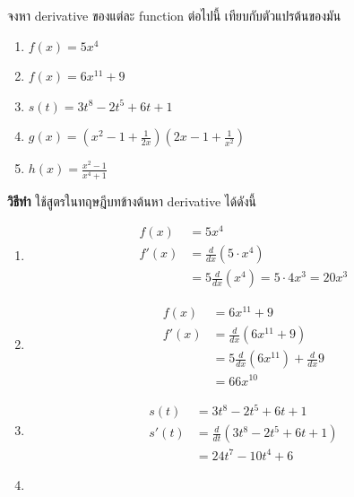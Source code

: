 \documentclass[
]{book}
\begin{document}
จงหา derivative ของแต่ละ function ต่อไปนี้ เทียบกับตัวแปรต้นของมัน

\begin{enumerate}
\def\labelenumi{(\arabic{enumi})}
\item
  \(f(x) = 5x^4\)
\item
  \(f(x) = 6x^{11} + 9\)
\item
  \(s(t) = 3t^8 - 2t^5 + 6t + 1\)
\item
  \(g(x) = \left( x^2 - 1 + \frac{1}{2x} \right) \left(2x - 1 + \frac{1}{x^2} \right)\)
\item
  \(h(x) = \frac{x^2 -1}{x^4 + 1}\)
\end{enumerate}

\textbf{วิธีทำ} ใช้สูตรในทฤษฎีบทข้างต้นหา derivative ได้ดังนี้

\begin{enumerate}
\def\labelenumi{(\arabic{enumi})}
\item
  \begin{equation}   \begin{aligned}
              f(x) &= 5x^4 \\
              f'(x) &= \frac{d}{dx}(5 \cdot x^4) \\
                  &= 5 \frac{d}{dx}( x^4) = 5 \cdot 4x^3 = 20x^3
    \end{aligned} \end{equation}
\item
  \begin{equation}   \begin{aligned}
              f(x) &= 6x^{11} + 9 \\
              f'(x) &= \frac{d}{dx}(6x^{11} + 9) \\
                  &= 5 \frac{d}{dx}(6x^{11}) + \frac{d}{dx}9\\
                  &= 66x^{10}
    \end{aligned} \end{equation}
\item
  \begin{equation}   \begin{aligned}
              s(t) &= 3t^8 - 2t^5 + 6t + 1 \\
              s'(t) &= \frac{d}{dt}(3t^8 - 2t^5 + 6t + 1) \\
                  &= 24t^7 - 10t^4 + 6
    \end{aligned} \end{equation}
\item
  \begin{equation}   \begin{aligned}

\end{aligned}
\end{equation}
\end{enumerate}
\end{document}
